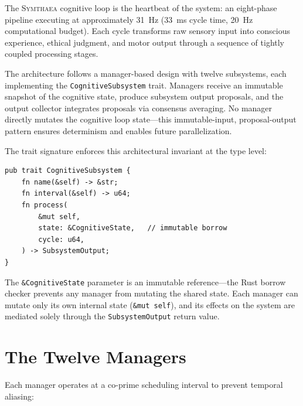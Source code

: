 \documentclass[12pt]{book}
\newcommand{\symthaea}{\textsc{Symthaea}}
\begin{document}
The \symthaea{} cognitive loop is the heartbeat of the system: an eight-phase pipeline executing at approximately 31~Hz (33~ms cycle time, 20~Hz computational budget). Each cycle transforms raw sensory input into conscious experience, ethical judgment, and motor output through a sequence of tightly coupled processing stages.

The architecture follows a manager-based design with twelve subsystems, each implementing the \texttt{CognitiveSubsystem} trait. Managers receive an immutable snapshot of the cognitive state, produce subsystem output proposals, and the output collector integrates proposals via consensus averaging. No manager directly mutates the cognitive loop state---this immutable-input, proposal-output pattern ensures determinism and enables future parallelization.

The trait signature enforces this architectural invariant at the type level:

\begin{lstlisting}[caption={The CognitiveSubsystem trait enforces immutable access.},label=lst:cognitive-subsystem]
pub trait CognitiveSubsystem {
    fn name(&self) -> &str;
    fn interval(&self) -> u64;
    fn process(
        &mut self,
        state: &CognitiveState,   // immutable borrow
        cycle: u64,
    ) -> SubsystemOutput;
}
\end{lstlisting}

The \texttt{\&CognitiveState} parameter is an immutable reference---the Rust borrow checker prevents any manager from mutating the shared state. Each manager can mutate only its own internal state (\texttt{\&mut self}), and its effects on the system are mediated solely through the \texttt{SubsystemOutput} return value.

\section{The Twelve Managers}

Each manager operates at a co-prime scheduling interval to prevent temporal aliasing:
\end{document}
